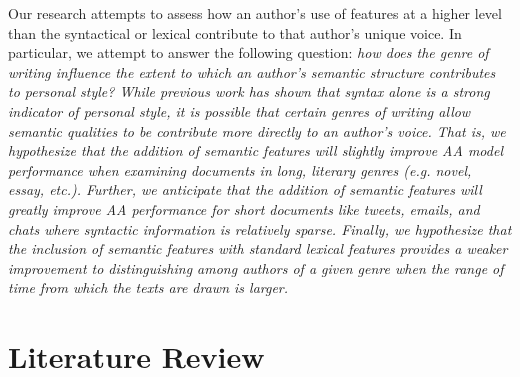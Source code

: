 \documentclass[11pt,a4paper]{article}
\begin{document}
Our research attempts to assess how an author's use of features at a higher level than the syntactical or lexical contribute to that author's unique voice. In particular, we attempt to answer the following question: \em how does the genre of writing influence the extent to which an author's semantic structure contributes to personal style? \em While previous work has shown that syntax alone is a strong indicator of personal style, it is possible that certain genres of writing allow semantic qualities to be contribute more directly to an author's voice. That is, we hypothesize that the addition of semantic features will \em slightly \em improve AA model performance when examining documents in long, literary genres (e.g. novel, essay, etc.). Further, we anticipate that the addition of semantic features will \em greatly \em improve AA performance for short documents like tweets, emails, and chats where syntactic information is relatively sparse. Finally, we hypothesize that the inclusion of semantic features with standard lexical features provides a weaker improvement to distinguishing among authors of a given genre when the range of time from which the texts are drawn is larger. 
\section{Literature Review}
\end{document}
